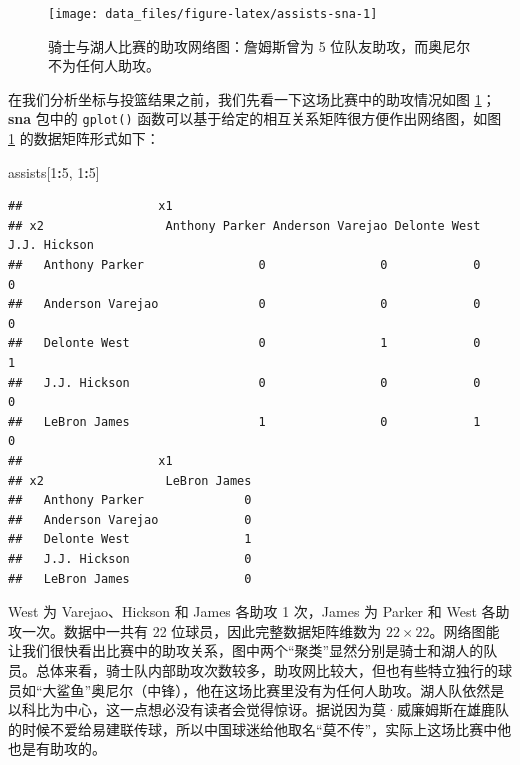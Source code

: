\documentclass[
  b5paper,
  UTF8,twoside]{book}
\newenvironment{Shaded}{\begin{snugshade}}{\end{snugshade}}
\newcommand{\DecValTok}[1]{\textcolor[rgb]{0.00,0.00,0.81}{#1}}
\newcommand{\NormalTok}[1]{#1}
\newcommand{\SpecialCharTok}[1]{\textcolor[rgb]{0.81,0.36,0.00}{\textbf{#1}}}
\begin{document}
\begin{figure}

{\centering \texttt{[image: data\_files/figure-latex/assists-sna-1]} 

}

\caption[ 骑士与湖人比赛的助攻网络图 ]{骑士与湖人比赛的助攻网络图：詹姆斯曾为 5 位队友助攻，而奥尼尔不为任何人助攻。}\label{fig:assists-sna}
\end{figure}



在我们分析坐标与投篮结果之前，我们先看一下这场比赛中的助攻情况如图 \ref{fig:assists-sna}；\textbf{sna} 包中的 \texttt{gplot()} 函数可以基于给定的相互关系矩阵很方便作出网络图，如图 \ref{fig:assists-sna} 的数据矩阵形式如下：

\begin{Shaded}
\begin{Highlighting}[]
\NormalTok{assists[}\DecValTok{1}\SpecialCharTok{:}\DecValTok{5}\NormalTok{, }\DecValTok{1}\SpecialCharTok{:}\DecValTok{5}\NormalTok{]}
\end{Highlighting}
\end{Shaded}

\begin{verbatim}
##                   x1
## x2                 Anthony Parker Anderson Varejao Delonte West J.J. Hickson
##   Anthony Parker                0                0            0            0
##   Anderson Varejao              0                0            0            0
##   Delonte West                  0                1            0            1
##   J.J. Hickson                  0                0            0            0
##   LeBron James                  1                0            1            0
##                   x1
## x2                 LeBron James
##   Anthony Parker              0
##   Anderson Varejao            0
##   Delonte West                1
##   J.J. Hickson                0
##   LeBron James                0
\end{verbatim}

West 为 Varejao、Hickson 和 James 各助攻 1 次，James 为 Parker 和 West 各助攻一次。数据中一共有 22 位球员，因此完整数据矩阵维数为 \(22\times22\)。网络图能让我们很快看出比赛中的助攻关系，图中两个``聚类''显然分别是骑士和湖人的队员。总体来看，骑士队内部助攻次数较多，助攻网比较大，但也有些特立独行的球员如``大鲨鱼''奥尼尔（中锋），他在这场比赛里没有为任何人助攻。湖人队依然是以科比为中心，这一点想必没有读者会觉得惊讶。据说因为莫·威廉姆斯在雄鹿队的时候不爱给易建联传球，所以中国球迷给他取名``莫不传''，实际上这场比赛中他也是有助攻的。
\end{document}
